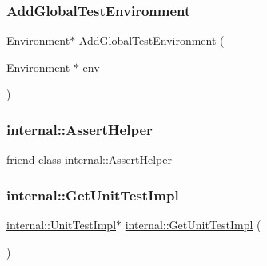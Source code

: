 \subsubsection{\texorpdfstring{Add\+Global\+Test\+Environment}{AddGlobalTestEnvironment}}
{\footnotesize\ttfamily \hyperlink{classtesting_1_1_environment}{Environment}$\ast$ Add\+Global\+Test\+Environment (\begin{DoxyParamCaption}\item[{\hyperlink{classtesting_1_1_environment}{Environment} $\ast$}]{env }\end{DoxyParamCaption})\hspace{0.3cm}{\ttfamily [friend]}}

\mbox{\label{classtesting_1_1_unit_test_a183151aa061362c87572e743fe233db1}} 
\subsubsection{\texorpdfstring{internal\+::\+Assert\+Helper}{internal::AssertHelper}}
{\footnotesize\ttfamily friend class \hyperlink{classtesting_1_1internal_1_1_assert_helper}{internal\+::\+Assert\+Helper}\hspace{0.3cm}{\ttfamily [friend]}}

\mbox{\label{classtesting_1_1_unit_test_a56e56be7066957d612e53b5c60f6ac08}} 
\subsubsection{\texorpdfstring{internal\+::\+Get\+Unit\+Test\+Impl}{internal::GetUnitTestImpl}}
{\footnotesize\ttfamily \hyperlink{classtesting_1_1internal_1_1_unit_test_impl}{internal\+::\+Unit\+Test\+Impl}$\ast$ \hyperlink{namespacetesting_1_1internal_a9bd0caf5d16512de38b39599c13ee634}{internal\+::\+Get\+Unit\+Test\+Impl} (\begin{DoxyParamCaption}{ }\end{DoxyParamCaption})\hspace{0.3cm}{\ttfamily [friend]}}

